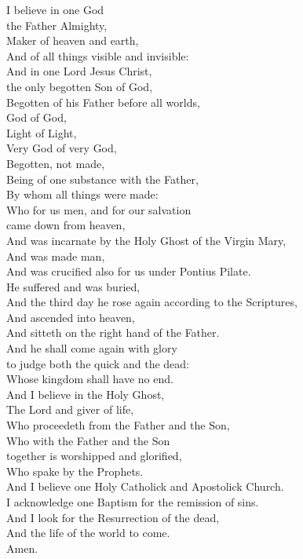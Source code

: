 I believe in one God\\
the Father Almighty,\\
Maker of heaven and earth,\\
And of all things visible and invisible:\\

And in one Lord Jesus Christ,\\
the only begotten Son of God,\\
Begotten of his Father before all worlds,\\
God of God,\\
Light of Light,\\
Very God of very God,\\
Begotten, not made,\\
Being of one substance with the Father,\\
By whom all things were made:\\
Who for us men, and for our salvation\\
came down from heaven,\\

And was incarnate by the Holy Ghost of the Virgin Mary,\\
And was made man,\\

And was crucified also for us under Pontius Pilate.\\
He suffered and was buried,\\
And the third day he rose again according to the Scriptures,\\
And ascended into heaven,\\
And sitteth on the right hand of the Father.\\
And he shall come again with glory\\
to judge both the quick and the dead:\\
Whose kingdom shall have no end.\\

And I believe in the Holy Ghost,\\
The Lord and giver of life,\\
Who proceedeth from the Father and the Son,\\
Who with the Father and the Son\\
together is worshipped and glorified,\\
Who spake by the Prophets.\\

And I believe one Holy Catholick and Apostolick Church.\\
I acknowledge one Baptism for the remission of sins.\\
And I look for the Resurrection of the dead,\\
And the life \cross of the world to come.\\
Amen.
